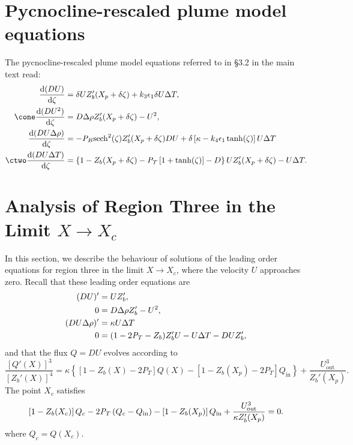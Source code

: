 \documentclass{article}
\begin{document}
\section{Pycnocline-rescaled plume model equations}
The pycnocline-rescaled plume model equations referred to in \S3.2 in the main text read:
\begin{align}
\dd{(DU)}{\zeta} &=\lt U Z_b'(X_p + \lt \zeta) + k_3 \epsone \lt U \Delta T,		\label{E:PycnoclineRegion:MassFull}	\\
\cone \dd{(DU^2)}{\zeta} &=  D\Delta \rho Z_b'(X_p + \lt \zeta)  -  U^2,	\label{E:PycnoclineRegion:MomFull}	\\
\dd{(DU\Delta \rho)}{\zeta} &= -\Pb \mathrm{sech}^2(\zeta)Z_b'(X_p + \lt \zeta)DU + \lt \left[\kappa - k_4 \epsone \tanh(\zeta)\right] U \Delta T \label{E:PycnoclineRegion:BuoyancyFull}		\\
\ctwo \dd{(DU\Delta T)}{\zeta} &= \left\{1 - Z_b(X_p + \lt \zeta) - \Pt\left[1 + \tanh(\zeta)\right] - D\right\}UZ_b'(X_p + \lt \zeta) -U\Delta T.\label{E:PycnoclineRegion:ThermalFull}
\end{align}

\section{Analysis of Region Three in the Limit $X \to X_c$}
In this section, we describe the behaviour of solutions of the leading order equations for region three in the limit $X \to X_c$, where the velocity $U$ approaches zero. Recall that these leading order equations are 
\begin{align}
 (DU)' &= U Z_b', \label{E:Region3:mass} \\
0 &= D \Delta \rho Z_b' - U^2, \label{E:Region3:mom}\\
(DU\Delta \rho)'  &=\kappa U \Delta T  \label{E:Region3:buoyancy}\\
0&= (1  - 2\textit{P}_T -  Z_b)Z_b'U- U\Delta T - DU Z_b',\label{E:Region3:thermal}
\end{align}
and that the flux $Q = DU$ evolves according to
\begin{equation}\label{E:Region3:Q_ODE}
\frac{\left[Q'(X)\right]^3}{\left[Z_b'(X)\right]^4} = \kappa \left\{ \left[1 - Z_b(X) - 2P_T\right] Q(X) - \left[1 - Z_b(X_p) - 2P_T\right]Q_\text{in}\right\} + \frac{U_\text{out}^3}{Z_b'(X_p)}.
\end{equation}
The point $X_c$ satisfies 
\begin{equation}
\left[1 - Z_b(X_c)\right]Q_c - 2\textit{P}_T\left(Q_c - Q_{\text{in}}\right) -\left[1 - Z_b(X_p)\right]Q_{\text{in}} +  \frac{U_{\text{out}}^3}{\kappa Z_b'(X_p)} = 0.
\end{equation}
where $Q_c = Q(X_c)$.
\end{document}
